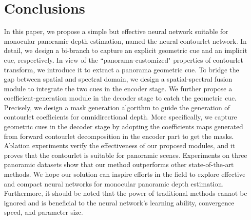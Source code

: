 \documentclass[10pt,times,mathptm,psfig,twocolumn,journals]{IEEEtran}
\begin{document}
\section{Conclusions}
In this paper, we propose a simple but effective neural network suitable for monocular panoramic depth estimation, named the neural contourlet network. In detail, we design a bi-branch to capture an explicit geometric cue and an implicit cue, respectively. In view of the ``panorama-customized" properties of contourlet transform, we introduce it to extract a panorama geometric cue. To bridge the gap between spatial and spectral domain, we design a spatial-spectral fusion module to integrate the two cues in the encoder stage. We further propose a coefficient-generation module in the decoder stage to catch the geometric cue. Precisely, we design a mask generation algorithm to guide the generation of contourlet coefficients for omnidirectional depth. More specifically, we capture geometric cues in the decoder stage by adopting the coefficients maps generated from forward contourlet decomposition in the encoder part to get the masks. Ablation experiments verify the effectiveness of our proposed modules, and it proves that the contourlet is suitable for panoramic scenes. Experiments on three panoramic datasets show that our method outperforms other state-of-the-art methods. We hope our solution can inspire efforts in the field to explore effective and compact neural networks for monocular panoramic depth estimation. Furthermore, it should be noted that the power of traditional methods cannot be ignored and is beneficial to the neural network's learning ability, convergence speed, and parameter size.
\normalem


\end{document}
